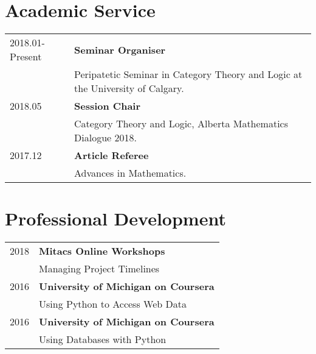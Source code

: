 \documentclass[10pt]{article}
\begin{document}
\section*{Academic Service}
\begin{tabu}{X[1]X[5]}
    2018.01-Present & \bf{Seminar Organiser}\\
{}& Peripatetic Seminar in Category Theory and Logic at the University of Calgary.\\

    2018.05 & \bf{Session Chair}\\
{}& Category Theory and Logic, Alberta Mathematics Dialogue 2018.\\

    2017.12 & \bf{Article Referee}\\
{}& Advances in Mathematics.\\

\end{tabu}

\section*{Professional Development}
\begin{tabu}{X[1]X[5]}
    2018 & \bf{Mitacs Online Workshops}\\
    &{}Managing Project Timelines\\ 

    2016 & \bf{University of Michigan on Coursera}\\
    &{}Using Python to Access Web Data\\ 

    2016 & \bf{University of Michigan on Coursera}\\
    &{}Using Databases with Python\\ 

\end{tabu}
\end{document}
